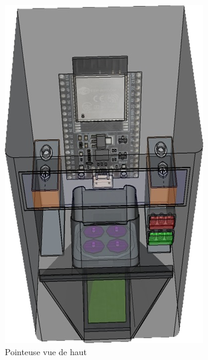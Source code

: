\begin{figure}[!htb]
\begin{minipage}{0.5\textwidth}
        \includegraphics[scale=0.6]{images/prototype/2.png}
        \caption{Pointeuse vue de haut}\label{ }
    \end{minipage}
\end{figure}

